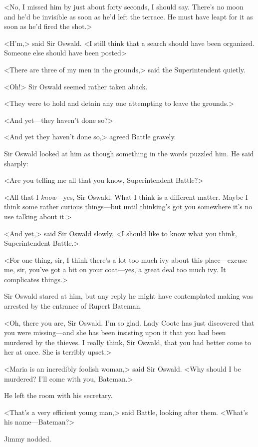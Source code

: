 <No, I missed him by just about forty seconds, I should say. There's no moon and he'd be invisible as soon as he'd left the terrace. He must have leapt for it as soon as he'd fired the shot.>

<H'm,> said Sir Oswald. <I still think that a search should have been organized. Someone else should have been posted\longdash>

<There are three of my men in the grounds,> said the Superintendent quietly.

<Oh!> Sir Oswald seemed rather taken aback.

<They were to hold and detain any one attempting to leave the grounds.>

<And yet—they haven't done so?>

<And yet they haven't done so,> agreed Battle gravely.

Sir Oswald looked at him as though something in the words puzzled him. He said sharply:

<Are you telling me all that you know, Superintendent Battle?>

<All that I \emph{know}—yes, Sir Oswald. What I think is a different matter. Maybe I think some rather curious things—but until thinking's got you somewhere it's no use talking about it.>

<And yet,> said Sir Oswald slowly, <I should like to know what you think, Superintendent Battle.>

<For one thing, sir, I think there's a lot too much ivy about this place—excuse me, sir, you've got a bit on your coat—yes, a great deal too much ivy. It complicates things.>

Sir Oswald stared at him, but any reply he might have contemplated making was arrested by the entrance of Rupert Bateman.

<Oh, there you are, Sir Oswald. I'm so glad. Lady Coote has just discovered that you were missing—and she has been insisting upon it that you had been murdered by the thieves. I really think, Sir Oswald, that you had better come to her at once. She is terribly upset.>

<Maria is an incredibly foolish woman,> said Sir Oswald. <Why should I be murdered? I'll come with you, Bateman.>

He left the room with his secretary.

<That's a very efficient young man,> said Battle, looking after them. <What's his name—Bateman?>

Jimmy nodded.

